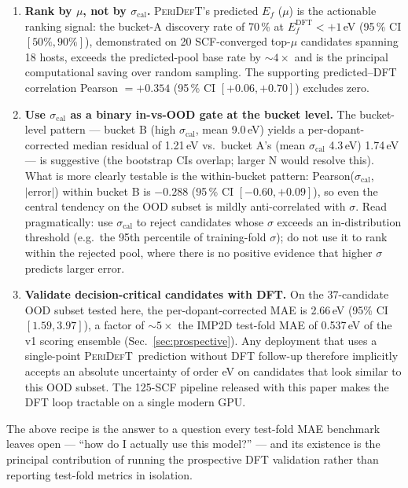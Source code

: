 \documentclass[11pt,a4paper]{article}
\newcommand{\modelname}{\textsc{PeriDefT}}
\begin{document}
\begin{enumerate}[leftmargin=20pt, itemsep=3pt]
\item \textbf{Rank by $\mu$, not by $\sigma_{\mathrm{cal}}$.}
\modelname's predicted $E_f$ ($\mu$) is the actionable
ranking signal: the bucket-A discovery rate of 70\,\% at
$E_f^{\mathrm{DFT}} < +1$\,eV (95\,\% CI $[50\%, 90\%]$),
demonstrated on 20 SCF-converged top-$\mu$ candidates spanning
18 hosts, exceeds the predicted-pool base rate by $\sim 4\times$
and is the principal computational saving over random sampling.
The supporting predicted--DFT correlation Pearson $= +0.354$
(95\,\% CI $[+0.06, +0.70]$) excludes zero.
\item \textbf{Use $\sigma_{\mathrm{cal}}$ as a binary in-vs-OOD gate
at the bucket level.} The bucket-level pattern --- bucket B (high
$\sigma_{\mathrm{cal}}$, mean 9.0\,eV) yields a per-dopant-corrected
median residual of 1.21\,eV vs.\ bucket A's (mean $\sigma_{\mathrm{cal}}$
4.3\,eV) 1.74\,eV --- is suggestive (the bootstrap CIs overlap;
larger N would resolve this). What is more clearly testable is
the within-bucket pattern: Pearson($\sigma_{\mathrm{cal}}$,
$|\mathrm{error}|$) within bucket B is $-0.288$ (95\,\% CI
$[-0.60, +0.09]$), so even the central tendency on the OOD subset
is mildly anti-correlated with $\sigma$. Read pragmatically: use
$\sigma_{\mathrm{cal}}$ to reject candidates whose $\sigma$
exceeds an in-distribution threshold (e.g.\ the 95th percentile of
training-fold $\sigma$); do not use it to rank within the rejected
pool, where there is no positive evidence that higher $\sigma$
predicts larger error.
\item \textbf{Validate decision-critical candidates with DFT.} On
the 37-candidate OOD subset tested here, the per-dopant-corrected
MAE is 2.66\,eV (95\% CI $[1.59, 3.97]$), a factor of $\sim 5\times$
the IMP2D test-fold MAE of 0.537\,eV of the v1 scoring ensemble
(Sec.~\ref{sec:prospective}). Any deployment that uses a
single-point \modelname\ prediction without DFT follow-up therefore
implicitly accepts an absolute uncertainty of order eV on candidates
that look similar to this OOD subset. The 125-SCF pipeline released
with this paper makes the DFT loop tractable on a single modern GPU.
\end{enumerate}

The above recipe is the answer to a question every test-fold MAE
benchmark leaves open --- ``how do I actually use this model?'' --- and
its existence is the principal contribution of running the prospective
DFT validation rather than reporting test-fold metrics in isolation.
\end{document}
